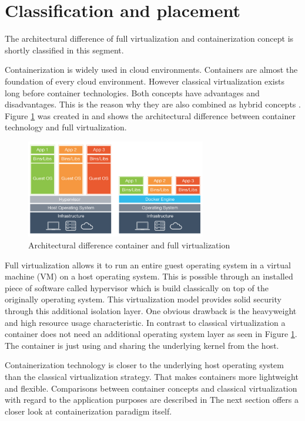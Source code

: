 \section{Classification and placement}
\label{sec:intro:virt_and_cont}
The architectural difference of full virtualization and containerization concept is shortly classified in this segment.

Containerization is widely used in cloud environments. Containers are almost the foundation of every cloud environment.
However classical virtualization exists long before container technologies.
Both concepts have advantages and disadvantages. 
This is the reason why they are also combined as hybrid concepts \cite{6498558}.
Figure \ref{fig:intro:diff_container_vm} was created in \cite{evol_cont} and shows the architectural difference between container technology and full virtualization.
 
\begin{figure}[htbp]
 \centering
 \includegraphics[width=0.7\textwidth]{gfx/examples/os_virt_diff}
 \caption{Architectural difference container and full virtualization}
 \label{fig:intro:diff_container_vm}
\end{figure}
Full virtualization allows it to run an entire guest operating system in a virtual machine (VM) on a host operating system. 
This is possible through an installed piece of software called hypervisor which is build classically on top of the originally operating system. 
This virtualization model provides solid security through this additional isolation layer. 
One obvious drawback is the heavyweight and high resource usage characteristic.
In contrast to classical virtualization a container does not need an additional operating system layer as seen in Figure \ref{fig:intro:diff_container_vm}. 
The container is just using and sharing the underlying kernel from the host. 

Containerization technology is closer to the underlying host operating system than the classical virtualization strategy. 
That makes containers more lightweight and flexible. 
Comparisons between container concepts and classical virtualization with regard to the application purposes are described in \cite{7921010}
The next section offers a closer look at containerization paradigm itself.

